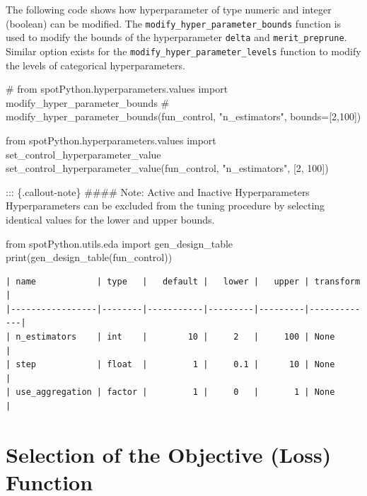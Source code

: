 \documentclass[
  letterpaper,
  DIV=11,
  numbers=noendperiod]{scrreprt}
\newenvironment{Shaded}{\begin{snugshade}}{\end{snugshade}}
\newcommand{\BuiltInTok}[1]{\textcolor[rgb]{0.00,0.23,0.31}{#1}}
\newcommand{\CommentTok}[1]{\textcolor[rgb]{0.37,0.37,0.37}{#1}}
\newcommand{\DecValTok}[1]{\textcolor[rgb]{0.68,0.00,0.00}{#1}}
\newcommand{\ImportTok}[1]{\textcolor[rgb]{0.00,0.46,0.62}{#1}}
\newcommand{\NormalTok}[1]{\textcolor[rgb]{0.00,0.23,0.31}{#1}}
\newcommand{\StringTok}[1]{\textcolor[rgb]{0.13,0.47,0.30}{#1}}
\begin{document}
The following code shows how hyperparameter of type numeric and integer
(boolean) can be modified. The \texttt{modify\_hyper\_parameter\_bounds}
function is used to modify the bounds of the hyperparameter
\texttt{delta} and \texttt{merit\_preprune}. Similar option exists for
the \texttt{modify\_hyper\_parameter\_levels} function to modify the
levels of categorical hyperparameters.

\begin{Shaded}
\begin{Highlighting}[]
\CommentTok{\# from spotPython.hyperparameters.values import modify\_hyper\_parameter\_bounds}
\CommentTok{\# modify\_hyper\_parameter\_bounds(fun\_control, "n\_estimators", bounds=[2,100])}

\ImportTok{from}\NormalTok{ spotPython.hyperparameters.values }\ImportTok{import}\NormalTok{ set\_control\_hyperparameter\_value}
\NormalTok{set\_control\_hyperparameter\_value(fun\_control, }\StringTok{"n\_estimators"}\NormalTok{, [}\DecValTok{2}\NormalTok{, }\DecValTok{100}\NormalTok{])}
\end{Highlighting}
\end{Shaded}

::: \{.callout-note\} \#\#\#\# Note: Active and Inactive Hyperparameters
Hyperparameters can be excluded from the tuning procedure by selecting
identical values for the lower and upper bounds.

\begin{Shaded}
\begin{Highlighting}[]
\ImportTok{from}\NormalTok{ spotPython.utils.eda }\ImportTok{import}\NormalTok{ gen\_design\_table}
\BuiltInTok{print}\NormalTok{(gen\_design\_table(fun\_control))}
\end{Highlighting}
\end{Shaded}

\begin{verbatim}
| name            | type   |   default |   lower |   upper | transform   |
|-----------------|--------|-----------|---------|---------|-------------|
| n_estimators    | int    |        10 |     2   |     100 | None        |
| step            | float  |         1 |     0.1 |      10 | None        |
| use_aggregation | factor |         1 |     0   |       1 | None        |
\end{verbatim}

\section{Selection of the Objective (Loss)
Function}\label{selection-of-the-objective-loss-function-1}
\end{document}
